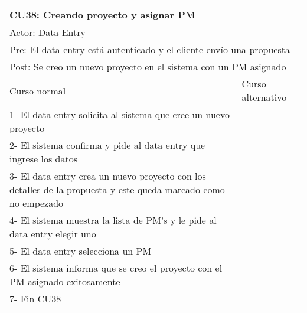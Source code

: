 \begin{table}[H]
  \begin{adjustbox}{max width = \textwidth}
  \begin{tabular}{|l|l|}
    \hline
    \multicolumn{2}{|l|}{CU38: Creando proyecto y asignar PM} \\\hline
    \multicolumn{2}{|l|}{Actor: Data Entry} \\\hline
    \multicolumn{2}{|l|}{Pre: El data entry está autenticado y el cliente envío una propuesta} \\\hline
    \multicolumn{2}{|l|}{Post: Se creo un nuevo proyecto en el sistema con un PM asignado} \\\hline
     Curso normal & Curso alternativo\\ \hline
	 1- El data entry solicita al sistema que cree un nuevo proyecto & \\ \hline
     2- El sistema confirma y pide al data entry que ingrese los datos & \\ \hline
	 3- El data entry crea un nuevo proyecto con los detalles de la propuesta y este queda marcado como no empezado & \\ \hline
	 4- El sistema muestra la lista de PM's y le pide al data entry elegir uno & \\ \hline
     5- El data entry selecciona un PM & \\ \hline
	 6- El sistema informa que se creo el proyecto con el PM asignado exitosamente & \\ \hline
     7- Fin CU38 & \\ \hline
  \end{tabular}
  \end{adjustbox}
\end{table}


